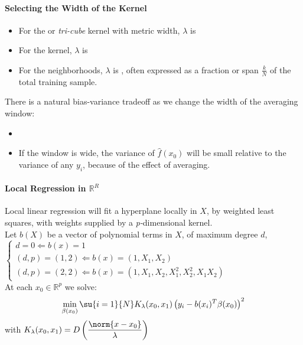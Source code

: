 \paragraph{Selecting the Width of the Kernel}
\begin{itemize}
	\item For the  or \emph{tri-cube} kernel with metric width, $\lambda$
		is 
	\item For the  kernel, $\lambda$ is 
	\item For the  neighborhoods, $\lambda$ is , often expressed as a fraction or span $\frac{k}{N}$ of the total
		training sample.
\end{itemize}
There is a natural bias-variance tradeoff as we change the width of the averaging window:
\begin{itemize}
	\item {}
	\item If the window is wide, the variance of $\hat{f}(x_{0})$ will be small relative to
		the variance of any $y_{i}$, because of the effect of averaging.
		
\end{itemize}

\paragraph{Local Regression in $\mathbb{R}^{R}$}
Local linear regression will fit a hyperplane locally in $X$, by weighted least squares, with 
weights supplied by a \emph{p-}dimensional kernel.\\
Let $b(X)$ be a vector of polynomial terms in $X$, of maximum degree $d$, 
$
\begin{cases}
	d=0 \Leftarrow b(x) = 1\\
	(d, p)=(1, 2) \Leftarrow b(x) = (1, X_{1}, X_{2})\\
	(d, p)=(2, 2) \Leftarrow b(x) = (1, X_{1}, X_{2}, X_{1}^{2}, X_{2}^{2}, X_{1}X_{2})
\end{cases}
$\\
At each $x_{0}\in\mathbb{R}^{p}$ we solve:
$$ \min\limits_{\beta(x_{0})}\su{{i=1}}{N}K_{\lambda}(x_{0},x_{1})\left(y_{i}-b(x_{i})^{T}\beta(x_{0})\right)^{2}$$ with $K_{\lambda}(x_{0},x_{1})=D\left(\dfrac{\norm{x-x_{0}}}{\lambda}\right)$

